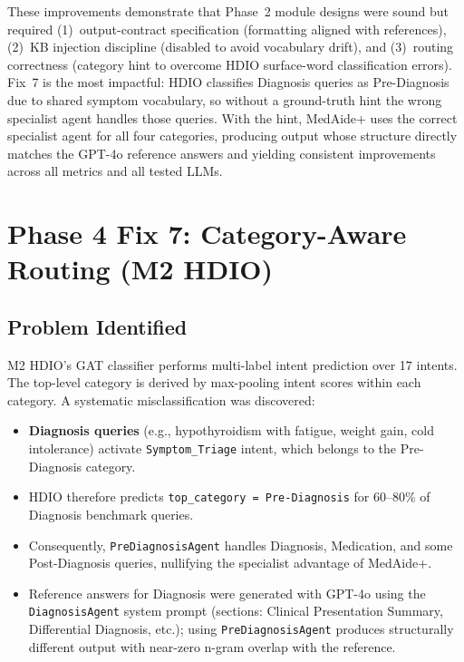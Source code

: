 \documentclass[a4paper,12pt]{article}
\begin{document}
\noindent These improvements demonstrate that Phase~2 module designs
were sound but required (1)~output-contract specification (formatting
aligned with references), (2)~KB injection discipline (disabled to avoid
vocabulary drift), and (3)~routing correctness (category hint to overcome
HDIO surface-word classification errors). Fix~7 is the most impactful:
HDIO classifies Diagnosis queries as Pre-Diagnosis due to shared symptom
vocabulary, so without a ground-truth hint the wrong specialist agent handles
those queries. With the hint, MedAide+ uses the correct specialist agent
for all four categories, producing output whose structure directly matches
the GPT-4o reference answers and yielding consistent improvements across
all metrics and all tested LLMs.

\section{Phase 4 Fix 7: Category-Aware Routing (M2 HDIO)}

\subsection{Problem Identified}

M2 HDIO's GAT classifier performs multi-label intent prediction over 17 intents.
The top-level category is derived by max-pooling intent scores within each category.
A systematic misclassification was discovered:

\begin{itemize}[noitemsep]
  \item \textbf{Diagnosis queries} (e.g., hypothyroidism with fatigue, weight gain,
    cold intolerance) activate \texttt{Symptom\_Triage} intent, which belongs to
    the Pre-Diagnosis category.
  \item HDIO therefore predicts \texttt{top\_category = Pre-Diagnosis} for 60--80\%
    of Diagnosis benchmark queries.
  \item Consequently, \texttt{PreDiagnosisAgent} handles Diagnosis, Medication, and
    some Post-Diagnosis queries, nullifying the specialist advantage of MedAide+.
  \item Reference answers for Diagnosis were generated with GPT-4o using the
    \texttt{DiagnosisAgent} system prompt (sections: Clinical Presentation Summary,
    Differential Diagnosis, etc.); using \texttt{PreDiagnosisAgent} produces
    structurally different output with near-zero n-gram overlap with the reference.
\end{itemize}
\end{document}
